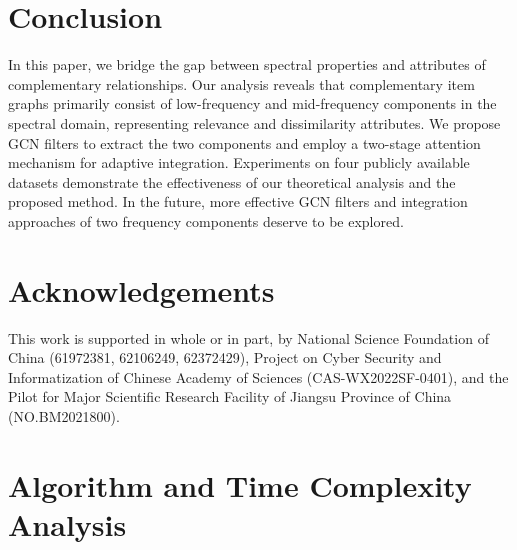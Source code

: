 \documentclass[letterpaper]{article} %
\begin{document}
 
 \section{Conclusion}
 In this paper, we bridge the gap between spectral properties and attributes of complementary relationships. Our analysis reveals that complementary item graphs primarily consist of low-frequency and mid-frequency components in the spectral domain, representing relevance and dissimilarity attributes. We propose GCN filters to extract the two components and employ a two-stage attention mechanism for adaptive integration. Experiments on four publicly available datasets demonstrate the effectiveness of our theoretical analysis and the proposed method. In the future, more effective GCN filters and integration approaches of two frequency components deserve to be explored.

\section{Acknowledgements}
This work is supported in whole or in part, by National Science Foundation of China (61972381, 62106249, 62372429), Project on Cyber Security and Informatization of Chinese Academy of Sciences (CAS-WX2022SF-0401), and the Pilot for Major Scientific Research Facility of Jiangsu Province of China (NO.BM2021800).

 
 
\clearpage
  \appendix
  \section{Algorithm and Time Complexity Analysis}
\end{document}
